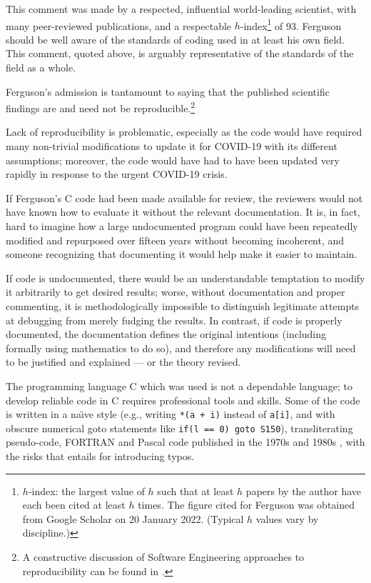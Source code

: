 \documentclass{comjnl}
\begin{document}
This comment was made by a respected, influential world-leading scientist, with many peer-reviewed publications, and a respectable $h$-index\footnote{$h$-index: the largest value of $h$ such that at least $h$ papers by the author have each been cited at least $h$ times. The figure cited for Ferguson was obtained from Google Scholar on 20 January 2022. (Typical $h$ values vary by discipline.)} of 93. Ferguson should be well aware of the standards of coding used in at least his own field. This comment, quoted above, is arguably representative of the standards of the field as a whole.

Ferguson's admission is tantamount to saying that the published scientific findings are and need not be reproducible.\footnote{A constructive discussion of Software Engineering approaches to reproducibility can be found in \cite{basic-reproducibilty}.} 

Lack of reproducibility is problematic, especially as the code would have required many non-trivial modifications to update it for COVID-19 with its different assumptions; moreover, the code would have had to have been updated very rapidly in response to the urgent COVID-19 crisis. 

If Ferguson's C code had been made available for review, the reviewers would not have known how to evaluate it without the relevant documentation. It is, in fact, hard to imagine how a large undocumented program could have been repeatedly modified and repurposed over fifteen years without becoming incoherent, and someone recognizing that documenting it would help make it easier to maintain. 

If code is undocumented, there would be an understandable temptation to modify it arbitrarily to get desired results; worse, without documentation and proper commenting, it is methodologically impossible to distinguish legitimate attempts at debugging from merely fudging the results. In contrast, if code is properly documented, the documentation defines the original intentions (including formally using mathematics to do so), and therefore any modifications will need to be justified and explained --- or the theory revised.

The programming language C which was used \cite{tweet} is not a dependable language; to develop reliable code in C requires professional tools and skills. Some of the code is written in a na\"\i ve style (e.g., writing \texttt{*(a + i)} instead of \texttt{a[i]}, and with obscure numerical goto statements like \texttt{if(l == 0) goto S150}), transliterating pseudo-code, FORTRAN and Pascal code published in the 1970s and 1980s , with the risks that entails for introducing typos. %
\end{document}
